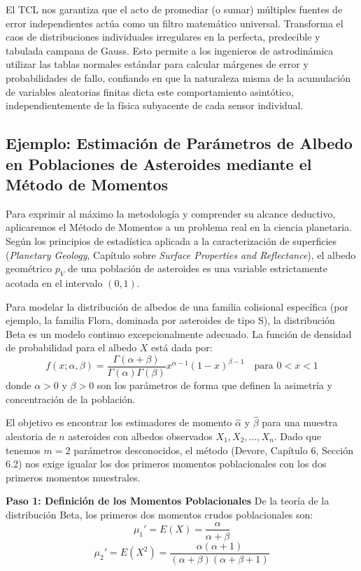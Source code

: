 El TCL nos garantiza que el acto de promediar (o sumar) múltiples fuentes de error independientes actúa como un filtro matemático universal. Transforma el caos de distribuciones individuales irregulares en la perfecta, predecible y tabulada campana de Gauss. Esto permite a los ingenieros de astrodinámica utilizar las tablas normales estándar para calcular márgenes de error y probabilidades de fallo, confiando en que la naturaleza misma de la acumulación de variables aleatorias finitas dicta este comportamiento asintótico, independientemente de la física subyacente de cada sensor individual.

\subsection{Ejemplo: Estimación de Parámetros de Albedo en Poblaciones de Asteroides mediante el Método de Momentos}

Para exprimir al máximo la metodología y comprender su alcance deductivo, aplicaremos el Método de Momentos a un problema real en la ciencia planetaria. Según los principios de estadística aplicada a la caracterización de superficies (\textit{Planetary Geology}, Capítulo sobre \textit{Surface Properties and Reflectance}), el albedo geométrico $p_V$ de una población de asteroides es una variable estrictamente acotada en el intervalo $(0, 1)$. 

Para modelar la distribución de albedos de una familia colisional específica (por ejemplo, la familia Flora, dominada por asteroides de tipo S), la distribución Beta es un modelo continuo excepcionalmente adecuado. La función de densidad de probabilidad para el albedo $X$ está dada por:
$$ f(x; \alpha, \beta) = \frac{\Gamma(\alpha+\beta)}{\Gamma(\alpha)\Gamma(\beta)} x^{\alpha-1} (1-x)^{\beta-1} \quad \text{para } 0 < x < 1 $$
donde $\alpha > 0$ y $\beta > 0$ son los parámetros de forma que definen la asimetría y concentración de la población.

El objetivo es encontrar los estimadores de momento $\hat{\alpha}$ y $\hat{\beta}$ para una muestra aleatoria de $n$ asteroides con albedos observados $X_1, X_2, \dots, X_n$. Dado que tenemos $m=2$ parámetros desconocidos, el método (Devore, Capítulo 6, Sección 6.2) nos exige igualar los dos primeros momentos poblacionales con los dos primeros momentos muestrales.

\textbf{Paso 1: Definición de los Momentos Poblacionales}
De la teoría de la distribución Beta, los primeros dos momentos crudos poblacionales son:
$$ \mu_1' = E(X) = \frac{\alpha}{\alpha + \beta} $$
$$ \mu_2' = E(X^2) = \frac{\alpha(\alpha + 1)}{(\alpha + \beta)(\alpha + \beta + 1)} $$

